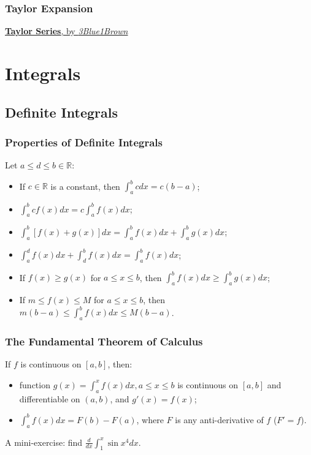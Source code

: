 \documentclass{beamer}
\begin{document}
\begin{frame}
\frametitle{Taylor Expansion}

\href{https://youtu.be/3d6DsjIBzJ4}{\textbf{Taylor Series}, by \textit{3Blue1Brown}}
\end{frame}


\section{Integrals}
\subsection{Definite Integrals}
\begin{frame}
\frametitle{Properties of Definite Integrals}
Let $a \leq d \leq b \in \mathbb{R}$:
\begin{itemize}
\item If $c \in \mathbb{R}$ is a constant, then $\int_{a}^b c dx = c(b-a)$;
\item $\int_{a}^b cf(x) dx = c\int_{a}^b f(x) dx$;
\item $\int_{a}^b [f(x)+g(x)] dx = \int_{a}^b f(x) dx + \int_{a}^b g(x) dx$;
\item $\int_{a}^d f(x) dx + \int_{d}^b f(x) dx = \int_{a}^b f(x) dx$;
\item If $f(x) \geq g(x)$ for $a \leq x \leq b$, then $\int_{a}^b f(x) dx \geq \int_{a}^b g(x) dx$;
\item If $m \leq f(x) \leq M$ for $a \leq x \leq b$, then $m(b-a) \leq \int_{a}^b f(x) dx \leq M(b-a)$.
\end{itemize}
\end{frame}

\begin{frame}
\frametitle{The Fundamental Theorem of Calculus}
If $f$ is continuous on $[a,b]$, then:
\begin{itemize}
\item function $g(x) = \int_a^x f(x) dx, a\leq x \leq b$ is continuous on $[a,b]$ and differentiable on $(a,b)$, and $g'(x) = f(x)$;
\item $\int_a^b f(x)dx = F(b)-F(a)$, where $F$ is any anti-derivative of $f$ ($F' = f$).
\end{itemize}
\vspace*{0.15in}
A mini-exercise: 
find $\frac{d}{dx}\int_1^x \sin x^4 dx$.

\end{frame}
\end{document}
